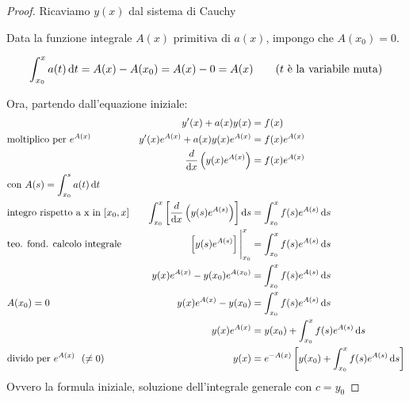 \begin{proof}
    Ricaviamo \(y(x)\) dal sistema di Cauchy

    Data la funzione integrale \(A(x)\) primitiva di \(a(x)\), impongo che \(A(x_0) = 0\).

    \[
        \int_{x_0}^{x} a(t) \mathop{}\!\mathrm{d} t = A(x) - A(x_0) = A(x) - 0 = A(x) \qquad (t\ \text{è la variabile muta})
    \]

    Ora, partendo dall'equazione iniziale:
    \begin{align*}
         &                                                & y'(x) + a(x)y(x)                                                                  & = f(x)                                                                  \\
         & \text{moltiplico per}\ e^{A(x)}                & y'(x)e^{A(x)} + a(x)y(x)e^{A(x)}                                                  & = f(x)e^{A(x)}                                                          \\
         &                                                & \frac{d}{\diff x} \left(y(x)e^{A(x)}\right)                                       & = f(x)e^{A(x)}                                                          \\
         & \text{con}\ A(s) = \int_{x_0}^{s} a(t) \diff t                                                                                                                                                               \\
         & \text{integro rispetto a x in}\ [x_0,x]        & \int_{x_0}^{x} \left[ \frac{d}{\diff x} \left(y(s)e^{A(s)}\right) \right] \diff s & = \int_{x_0}^{x} f(s)e^{A(s)} \diff s                                   \\
         & \text{teo{. }fond{. }calcolo integrale}        & \left[ y(s)e^{A(s)} \right] \Bigg|_{x_0}^{x}                                      & = \int_{x_0}^{x} f(s)e^{A(s)} \diff s                                   \\
         &                                                & y(x)e^{A(x)} - y(x_0)e^{A(x_0)}                                                   & = \int_{x_0}^{x} f(s)e^{A(s)} \diff s                                   \\
         & A(x_0) = 0                                     & y(x)e^{A(x)} - y(x_0)                                                             & = \int_{x_0}^{x} f(s)e^{A(s)} \diff s                                   \\
         &                                                & y(x)e^{A(x)}                                                                      & = y(x_0) + \int_{x_0}^{x} f(s)e^{A(s)} \diff s                          \\
         & \text{divido per}\ e^{A(x)}\ \ (\ne 0)         & y(x)                                                                              & = e^{-A(x)} \left[ y(x_0) + \int_{x_0}^{x} f(s)e^{A(s)} \diff s \right] \\
    \end{align*}
    Ovvero la formula iniziale, soluzione dell'integrale generale con \(c = y_0\)

\end{proof}
